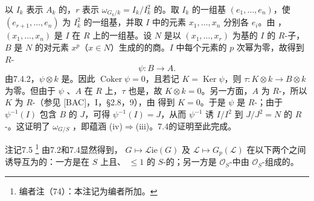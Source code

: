 以 $I_k$ 表示 $A_k$ 的，$r$ 表示 $\omega_{G_k/k}=I_k/I_k^2$ 的。取 $I_k$ 的一组基 $(e_1,\ldots,e_n)$，使 $(e_{r+1},\ldots,e_n)$ 为 $I_k^2$ 的一组基，并取 $I$ 中的元素 $x_1,\ldots,x_n$ 分别各 $e_i$。由 ，$(x_1,\ldots,x_n)$ 是 $I$ 在 $R$ 上的一组基。设 $N$ 是以 $(x_1,\ldots,x_r)$ 为基的 $I$ 的 $R$-子，$B$ 是 $N$ 的对元素 $x^p$（$x\in N$）生成的的商。$I$ 中每个元素的 $p$ 次幂为零，故得到 $R$-
\[
 \psi:B\longrightarrow A.
\]
由7.4.2，$\psi\otimes k$ 是。因此 $\operatorname{Coker}\psi=0$，且若记 $K=\operatorname{Ker}\psi$，则 $\tau:K\otimes k\to B\otimes k$ 为零。但由于 $\psi$ 、$A$ 在 $R$ 上，$\tau$ 也是，故 $K\otimes k=0$。另一方面，$A$ 为 $R$-，所以 $K$ 为 $R$-（参见 [BAC]，I，\S2.8，9），由 得到 $K=0$。于是 $\psi$ 是 $R$-；由于 $\psi^{-1}(I)$ 包含 $B$ 的 $J$，可得 $\psi^{-1}(I)=J$，从而 $\psi^{-1}$ 诱 $I/I^2$ 到 $J/J^2=N$ 的 $R$-。这证明了 $\omega_{G/S}$ ，即蕴涵 (iv)$\Rightarrow$(iii)。7.4的证明至此完成。

\begin{SGAresult}{注记}{7.5}
\footnote{编者注（74）：本注记为编者所加。}
由7.2和7.4显然得到， $G\mapsto\mathscr{L}\mathrm{ie}(G)$ 及 $\mathcal L\mapsto G_p(\mathcal L)$ 在以下两个之间诱导互为的：一方是在 $S$ 上且、 $\le1$ 的 $S$-的；另一方是 $\mathcal O_S$-中由 $\mathcal O_S$-组成的。
\end{SGAresult}


